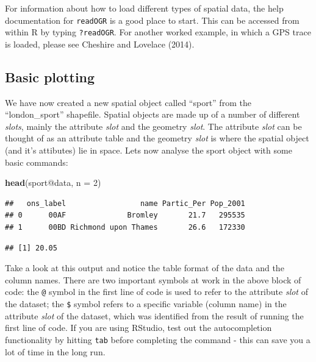 \documentclass[]{article}
\newenvironment{Shaded}{}{}
\newcommand{\KeywordTok}[1]{\textcolor[rgb]{0.00,0.44,0.13}{\textbf{{#1}}}}
\newcommand{\DataTypeTok}[1]{\textcolor[rgb]{0.56,0.13,0.00}{{#1}}}
\newcommand{\DecValTok}[1]{\textcolor[rgb]{0.25,0.63,0.44}{{#1}}}
\newcommand{\NormalTok}[1]{{#1}}
\begin{document}
For information about how to load different types of spatial data, the
help documentation for \texttt{readOGR} is a good place to start. This
can be accessed from within R by typing \texttt{?readOGR}. For another
worked example, in which a GPS trace is loaded, please see Cheshire and
Lovelace (2014).

\subsection{Basic plotting}\label{basic-plotting}

We have now created a new spatial object called ``sport'' from the
``london\_sport'' shapefile. Spatial objects are made up of a number of
different \emph{slots}, mainly the attribute \emph{slot} and the
geometry \emph{slot}. The attribute \emph{slot} can be thought of as an
attribute table and the geometry \emph{slot} is where the spatial object
(and it's attibutes) lie in space. Lets now analyse the sport object
with some basic commands:

\begin{Shaded}
\begin{Highlighting}[]
\KeywordTok{head}\NormalTok{(sport@data, }\DataTypeTok{n =} \DecValTok{2}\NormalTok{)}
\end{Highlighting}
\end{Shaded}

\begin{verbatim}
##   ons_label                 name Partic_Per Pop_2001
## 0      00AF              Bromley       21.7   295535
## 1      00BD Richmond upon Thames       26.6   172330
\end{verbatim}

\begin{Shaded}
\end{Shaded}

\begin{verbatim}
## [1] 20.05
\end{verbatim}

Take a look at this output and notice the table format of the data and
the column names. There are two important symbols at work in the above
block of code: the \texttt{@} symbol in the first line of code is used
to refer to the attribute \emph{slot} of the dataset; the \texttt{\$}
symbol refers to a specific variable (column name) in the attribute
\emph{slot} of the dataset, which was identified from the result of
running the first line of code. If you are using RStudio, test out the
autocompletion functionality by hitting \texttt{tab} before completing
the command - this can save you a lot of time in the long run.
\end{document}
